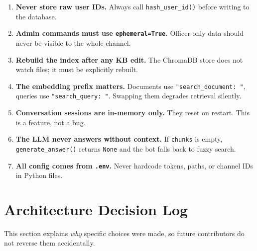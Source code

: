\documentclass[12pt,letterpaper]{article}
\begin{document}
\begin{infobox}
\begin{enumerate}[leftmargin=1.5em]
  \item \textbf{Never store raw user IDs.} Always call \texttt{hash\_user\_id()}
        before writing to the database.
  \item \textbf{Admin commands must use \texttt{ephemeral=True}.} Officer-only
        data should never be visible to the whole channel.
  \item \textbf{Rebuild the index after any KB edit.} The ChromaDB store does
        not watch files; it must be explicitly rebuilt.
  \item \textbf{The embedding prefix matters.} Documents use
        \texttt{"search\_document: "}, queries use \texttt{"search\_query: "}.
        Swapping them degrades retrieval silently.
  \item \textbf{Conversation sessions are in-memory only.} They reset on restart.
        This is a feature, not a bug.
  \item \textbf{The LLM never answers without context.} If \texttt{chunks} is
        empty, \texttt{generate\_answer()} returns \texttt{None} and the bot
        falls back to fuzzy search.
  \item \textbf{All config comes from \texttt{.env}.} Never hardcode tokens,
        paths, or channel IDs in Python files.
\end{enumerate}
\end{infobox}

\section{Architecture Decision Log}

This section explains \emph{why} specific choices were made, so future
contributors do not reverse them accidentally.
\end{document}
